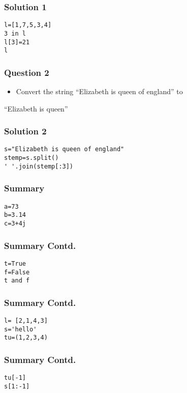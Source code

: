 \documentclass[presentation]{beamer}
\begin{document}
\begin{frame}[fragile]
\frametitle{Solution 1}
\label{sec-16}

\begin{verbatim}
l=[1,7,5,3,4]
3 in l
l[3]=21
l
\end{verbatim}
\end{frame}
\begin{frame}
\frametitle{Question 2}
\label{sec-17}

\begin{itemize}
\item Convert the string ``Elizabeth is queen of england'' to
\end{itemize}

``Elizabeth is queen''
\end{frame}
\begin{frame}[fragile]
\frametitle{Solution 2}
\label{sec-18}

\begin{verbatim}
s="Elizabeth is queen of england"                                                                                                                 
stemp=s.split()                                                                                                                                   
' '.join(stemp[:3])
\end{verbatim}
\end{frame}
\begin{frame}[fragile]
\frametitle{Summary}
\label{sec-19}

\begin{verbatim}
a=73
b=3.14
c=3+4j
\end{verbatim}
\end{frame}
\begin{frame}[fragile]
\frametitle{Summary Contd.}
\label{sec-20}

\begin{verbatim}
t=True
f=False
t and f
\end{verbatim}
\end{frame}
\begin{frame}[fragile]
\frametitle{Summary Contd.}
\label{sec-21}

\begin{verbatim}
l= [2,1,4,3]
s='hello'
tu=(1,2,3,4)
\end{verbatim}
\end{frame}
\begin{frame}[fragile]
\frametitle{Summary Contd.}
\label{sec-22}

\begin{verbatim}
tu[-1]
s[1:-1]
\end{verbatim}
\end{frame}
\end{document}

